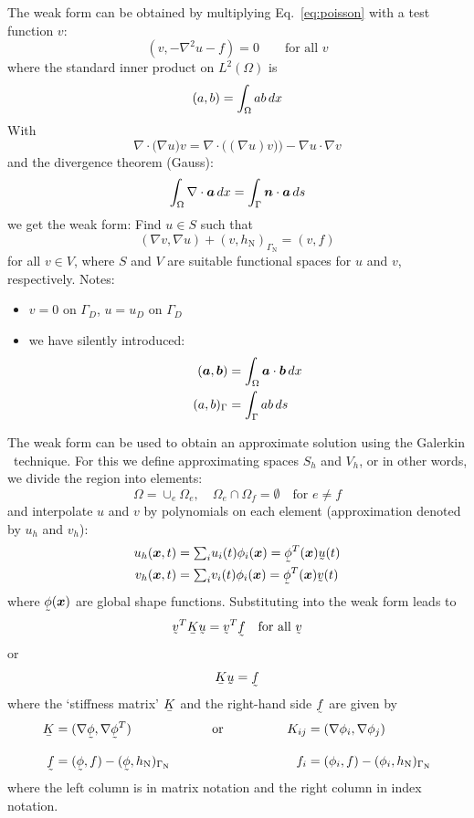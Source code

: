 The weak form can be obtained by multiplying Eq.~\eqref{eq:poisson}
with a test function $v$:
\[
   (v,-\nabla^2 u-f)=0\qquad\text{for all }v
\]
where the standard inner product on $L^2(\Omega)$ is
\[
    (a,b)=\int_\Omega ab \,d x
   \label{eq:innerproduct}
\]
With
\[
   \nabla\cdot\big(\nabla u\big)v=\nabla\cdot\big((\nabla u)v)\big)-\nabla
u\cdot\nabla v
\]
and the divergence theorem (Gauss):
\[
    \int_\Omega\nabla\cdot\boldsymbol{a}\,d x=\int_\Gamma\boldsymbol{n}\cdot\boldsymbol{a}\,d s
\]
we get the weak form: Find $u\in S$ such that
\begin{equation}
   (\nabla v,\nabla u) +(v,h_{\text{N}})_{\Gamma_{\text{N}}}=(v,f)
   \label{eq:weakformpoisson}
\end{equation}
for all $v\in V$, where $S$ and $V$ are suitable functional spaces for $u$ and
$v$, respectively. Notes:
\begin{itemize}
  \itemsep -1ex
   \item $v=0$ on $\Gamma_D$, $u=u_D$ on $\Gamma_D$
   \item we have silently introduced:
\begin{align*}
   (\boldsymbol{a}, \boldsymbol{b})&=\int_\Omega\boldsymbol{a}\cdot\boldsymbol{b}\,d x\\
   (a,b)_{\Gamma}&=\int_\Gamma a b\,d s
\end{align*}
\end{itemize}

The weak form can be used to obtain an approximate solution using the Galerkin \fem\
technique. For this we define approximating 
spaces $S_h$ and $V_h$, or in other words, we divide the region into elements:
\[
\Omega=\cup_e\Omega_e, \quad\Omega_{e}\cap\Omega_{f}=\emptyset\quad
   \text{for }e\neq f
\]
and interpolate $u$ and $v$ by
polynomials on each element (approximation denoted by $u_h$ and $v_h$):
\begin{align*}
    u_h(\vek x,t)&=\tsum_i u_i(t)\phi_i(\vek x)=\col\phi^T(\vek x)\col u(t)
\\
    v_h(\vek x,t)&=\tsum_i v_i(t)\phi_i(\vek x)=\col\phi^T(\vek x)\col v(t)
\end{align*}
where $\col\phi(\vek x)$ are global shape functions.  Substituting into the
weak form leads to
\[
 \col v^T\mat K\col u=
        \col v^T\col f \quad\text{for all }\col v
\]
or
\[
 \mat K\col u= \col f
\]
where the `stiffness matrix' $\mat K$ and
the right-hand side $\col f$ are given by
\begin{alignat*}{2}
 \mat K&=(\nabla{\col\phi},\nabla{\col\phi^T})\qquad\qquad\qquad\text{  or}&\qquad\qquad
K_{ij}&=(\nabla{\phi_i}, \nabla{\phi_j}) \\[2ex]
\col f&= (\col\phi,f)-(\col\phi,h_{\text{N}})_{\Gamma_{\text{N}}} &
f_i&= (\phi_i,f)-(\phi_i,h_{\text{N}})_{\Gamma_{\text{N}}}
\end{alignat*}
where the left column is in matrix notation and the right column in index
notation.



